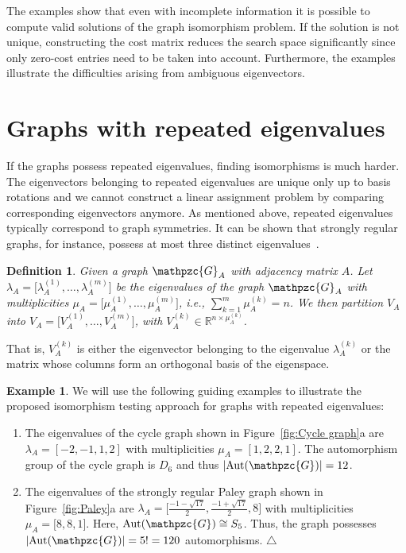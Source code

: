 \documentclass
[
    a4paper,
    DIV=11,
    abstracton
]
{scrartcl}
\newcommand{\R}{\mathbb{R}}
\newcommand{\mc}[1]{\mathpzc{#1}}
\providecommand{\abs}[1]{\left\lvert #1 \right\rvert}
\newcommand\xqed[1]{\leavevmode\unskip\penalty9999 \hbox{}\nobreak\hfill \quad\hbox{#1}}
\newcommand{\exampleSymbol}{\xqed{$\triangle$}}
\DeclareMathOperator{\Aut}{Aut}
\newtheorem{definition}[theorem]{Definition}
\theoremstyle{definition}
\newtheorem{example}[theorem]{Example}
\begin{document}
The examples show that even with incomplete information it is possible to compute valid solutions of the graph isomorphism problem. If the solution is not unique, constructing the cost matrix reduces the search space significantly since only zero-cost entries need to be taken into account. Furthermore, the examples illustrate the difficulties arising from ambiguous eigenvectors.

\section{Graphs with repeated eigenvalues}
\label{sec:Graphs with repeated eigenvalues}

If the graphs possess repeated eigenvalues, finding isomorphisms is much harder. The eigenvectors belonging to repeated eigenvalues are unique only up to basis rotations and we cannot construct a linear assignment problem by comparing corresponding eigenvectors anymore. As mentioned above, repeated eigenvalues typically correspond to graph symmetries. It can be shown that strongly regular graphs, for instance, possess at most three distinct eigenvalues~\cite{Lov07}.

\begin{definition} \label{def:Eigenvector partitioning}
Given a graph $ \mc{G}_A $ with adjacency matrix $ A $. Let $ \lambda_A = \big[ \lambda_A^{(1)}, \dots, \lambda_A^{(m)} \big] $ be the eigenvalues of the graph $ \mc{G}_A $ with multiplicities $ \mu_A = \big[ \mu_A^{(1)}, \dots, \mu_A^{(m)} \big] $, i.e., $ \sum_{k=1}^m \mu_A^{(k)} = n $. We then partition $ V_A $ into $ V_A = \big[ V_A^{(1)}, \dots, V_A^{(m)} \big] $, with $ V_A^{(k)} \in \R^{n \times \mu_A^{(k)}} $.
\end{definition}

That is, $ V_A^{(k)} $ is either the eigenvector belonging to the eigenvalue $ \lambda_A^{(k)} $ or the matrix whose columns form an orthogonal basis of the eigenspace.

\begin{example} \label{ex:Symmetric graphs}
We will use the following guiding examples to illustrate the proposed isomorphism testing approach for graphs with repeated eigenvalues:
\begin{enumerate}[leftmargin=0em,itemindent=1.7em,labelsep=0.3em,label=\roman*)] \setlength{\itemsep}{0mm}
\item The eigenvalues of the cycle graph shown in Figure~\ref{fig:Cycle graph}a are $ \lambda_A = [-2, -1, 1, 2] $ with multiplicities $ \mu_A = [1, 2, 2, 1] $. The automorphism group of the cycle graph is $ D_6 $ and thus $ \abs{\Aut(\mc{G})} = 12 $.

\item The eigenvalues of the strongly regular Paley graph shown in Figure~\ref{fig:Paley}a are $ \lambda_A = \big[ \frac{-1 - \sqrt{17}}{2}, \frac{-1 + \sqrt{17}}{2}, 8 \big] $ with multiplicities $ \mu_A = \big[ 8, 8, 1 \big] $. Here, $ \Aut(\mc{G}) \cong S_5 $. Thus, the graph possesses $ \abs{\Aut(\mc{G})} = 5! = 120 $ automorphisms. \exampleSymbol
\end{enumerate}
\end{example}
\end{document}
